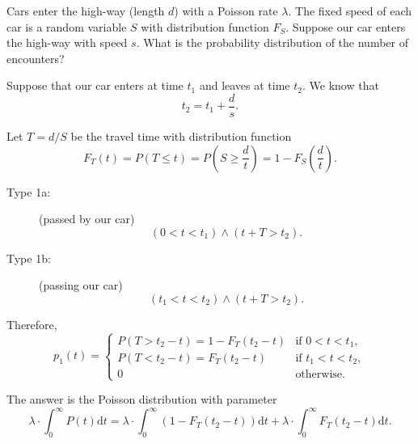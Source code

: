 \begin{example}
Cars enter the high-way (length $ d $) with a Poisson rate $ \lambda $. The fixed speed of each car is a random variable $ S $ with distribution function $ F_{S} $. Suppose our car enters the high-way with speed $ s $. What is the probability distribution of the number of encounters?

Suppose that our car enters at time $ t_{1} $ and leaves at time $ t_{2} $. We know that
\[ t_{2} = t_{1} + \frac{d}{s}. \]

Let $ T = d / S $ be the travel time with distribution function
\[ F_{T}(t) = P(T \le t) = P \left( S \ge \frac{d}{t} \right) = 1 - F_{S} \left( \frac{d}{t} \right). \]

\begin{description}
  \item[Type 1a:] (passed by our car) \\
    \[ (0 < t < t_{1}) \wedge (t + T > t_{2}). \]
  \item[Type 1b:] (passing our car) \\
    \[ (t_{1} < t < t_{2}) \wedge (t + T > t_{2}). \]
\end{description}

Therefore,
\[ p_{1}(t) =
  \begin{cases}
    P(T > t_{2} - t) = 1 - F_{T}(t_{2} - t)   & \text{if } 0 < t < t_{1}, \\
    P(T < t_{2} - t) = F_{T}(t_{2} - t)       & \text{if } t_{1} < t < t_{2}, \\
    0                                         & \text{otherwise}.
  \end{cases} \]

The answer is the Poisson distribution with parameter
\[ \lambda \cdot \int_{0}^{\infty} P(t) \mathrm{d}t = \lambda \cdot \int_{0}^{\infty} (1 - F_{T}(t_{2} - t)) \mathrm{d}t + \lambda \cdot \int_{0}^{\infty} F_{T}(t_{2} - t) \mathrm{d}t. \]
\end{example}

